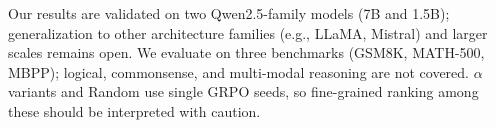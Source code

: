 
Our results are validated on two Qwen2.5-family models (7B and 1.5B); generalization to other architecture families (e.g., LLaMA, Mistral) and larger scales remains open.
We evaluate on three benchmarks (GSM8K, MATH-500, MBPP); logical, commonsense, and multi-modal reasoning are not covered.
\rasp{} $\alpha$ variants and Random use single GRPO seeds, so fine-grained ranking among these should be interpreted with caution.
